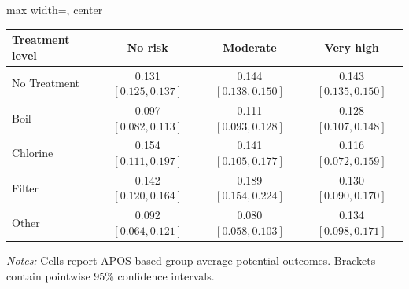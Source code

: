 \begin{table}[p]
\begin{adjustbox}{max width=\linewidth, center}
\begin{tabular}{lccc}
Treatment level & No risk & Moderate & Very high \\
\midrule
No Treatment & 0.131 {\scriptsize$[0.125,0.137]$} & 0.144 {\scriptsize$[0.138,0.150]$} & 0.143 {\scriptsize$[0.135,0.150]$} \\
Boil & 0.097 {\scriptsize$[0.082,0.113]$} & 0.111 {\scriptsize$[0.093,0.128]$} & 0.128 {\scriptsize$[0.107,0.148]$} \\
Chlorine & 0.154 {\scriptsize$[0.111,0.197]$} & 0.141 {\scriptsize$[0.105,0.177]$} & 0.116 {\scriptsize$[0.072,0.159]$} \\
Filter & 0.142 {\scriptsize$[0.120,0.164]$} & 0.189 {\scriptsize$[0.154,0.224]$} & 0.130 {\scriptsize$[0.090,0.170]$} \\
Other & 0.092 {\scriptsize$[0.064,0.121]$} & 0.080 {\scriptsize$[0.058,0.103]$} & 0.134 {\scriptsize$[0.098,0.171]$} \\
\bottomrule
\end{tabular}
\end{adjustbox}
\par\vspace{3pt}
\begin{minipage}{\linewidth}\footnotesize \textit{Notes:} Cells report APOS-based group average potential outcomes. Brackets contain pointwise 95\% confidence intervals.\end{minipage}
\end{table}
